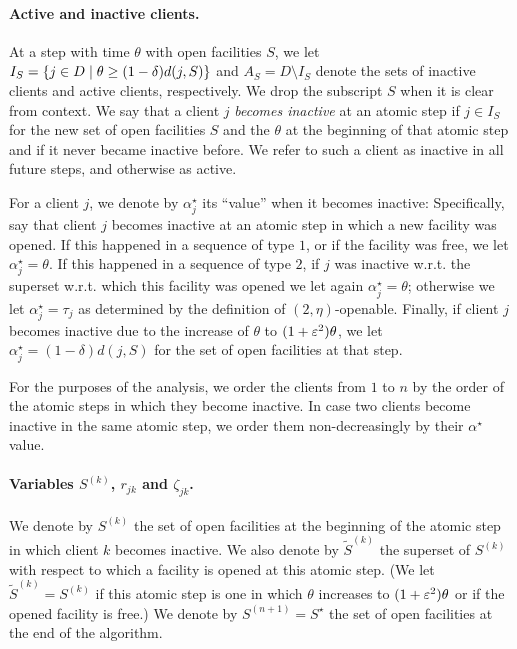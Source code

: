 \paragraph{Active and inactive clients.}
At a step with time $\theta$ with open facilities $S$, we let\linebreak $I_S = \left\{j \in D \mid \theta \geq (1-\delta) d(j, S)\right\}$ and $A_S = D \setminus I_S$ denote the sets of inactive clients and active clients, respectively. We drop the subscript $S$ when it is clear from context.
We say that a client $j$ \emph{becomes inactive} at an atomic step if $j \in I_S$ for the new set of open facilities $S$ and the $\theta$ at the beginning of that atomic step and if it never became inactive before.
We refer to such a client as inactive in all future steps, and otherwise as active.

For a client $j$, we denote by $\alpha_j^\star$ its ``value'' when it becomes inactive: Specifically, say that client $j$ becomes inactive at an atomic step in which a new facility was opened.
If this happened in a sequence of type $1$, or if the facility was free, we let $\alpha_j^\star = \theta$.
If this happened in a sequence of type $2$, if $j$ was inactive w.r.t. the superset w.r.t. which this facility was opened we let again $\alpha_j^\star = \theta$; otherwise we let $\alpha_j^\star = \tau_j$ as determined by the definition of $(2,\eta)$-openable.
Finally, if client $j$ becomes inactive due to the increase of $\theta$ to $(1+\varepsilon^2)\theta$, we let $\alpha_j^\star = (1-\delta) d(j, S)$ for the set of open facilities at that step.

For the purposes of the analysis, we order the clients from $1$ to $n$ by the order of the atomic steps in which they become inactive. 
In case two clients become inactive in the same atomic step, we order them non-decreasingly by their $\alpha^\star$ value.

\paragraph{Variables $S^{(k)}$, $r_{jk}$ and $\zeta_{jk}$.}
We denote by $S^{(k)}$ the set of open facilities at the beginning of the atomic step in which client $k$ becomes inactive.
We also denote by $\tilde{S}^{(k)}$ the superset of $S^{(k)}$ with respect to which a facility is opened at this atomic step. (We let $\tilde{S}^{(k)} = S^{(k)}$ if this atomic step is one in which $\theta$ increases to $(1+\varepsilon^2)\theta$ or if the opened facility is free.)
We denote by $S^{(n+1)} = S^\star$ the set of open facilities at the end of the algorithm.

